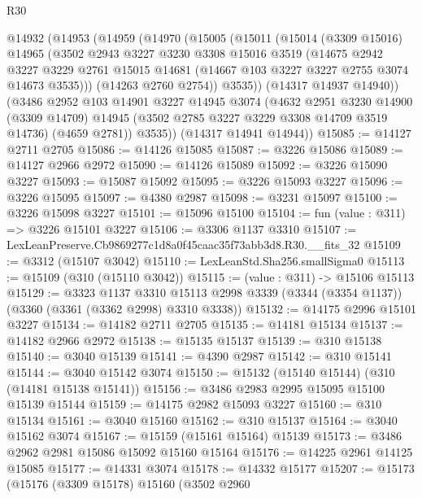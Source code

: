 \begin{lexlean}{R30}
\begin{coremodule}
  @14932
    (@14953
      (@14959
        (@14970
          (@15005
            (@15011
              (@15014
                (@3309 @15016)
                @14965
                (@3502
                  @2943
                  @3227
                  @3230
                  @3308
                  @15016
                  @3519
                  (@14675
                    @2942
                    @3227
                    @3229
                    @2761
                    @15015
                    @14681
                    (@14667 @103 @3227 @3227 @2755 @3074 @14673 @3535)))
                (@14263 @2760 @2754))
              @3535))
          (@14317 @14937 @14940))
        (@3486
          @2952
          @103
          @14901
          @3227
          @14945
          @3074
          (@4632
            @2951
            @3230
            @14900
            (@3309 @14709)
            @14945
            (@3502 @2785 @3227 @3229 @3308 @14709 @3519 @14736)
            (@4659 @2781))
          @3535))
      (@14317 @14941 @14944))
@15085 := @14127 @2711 @2705
@15086 := @14126 @15085
@15087 := @3226 @15086
@15089 := @14127 @2966 @2972
@15090 := @14126 @15089
@15092 := @3226 @15090 @3227
@15093 := @15087 @15092
@15095 := @3226 @15093 @3227
@15096 := @3226 @15095
@15097 := @4380 @2987
@15098 := @3231 @15097
@15100 := @3226 @15098 @3227
@15101 := @15096 @15100
@15104 := fun (value : @311) => @3226 @15101 @3227
@15106 := @3306 @1137 @3310
@15107 := LexLeanPreserve.Cb9869277c1d8a0f45caac35f73abb3d8.R30.__fits_32
@15109 := @3312 (@15107 @3042)
@15110 := LexLeanStd.Sha256.smallSigma0
@15113 := @15109 (@310 (@15110 @3042))
@15115 := (value : @311) -> @15106 @15113
@15129 := @3323
    @1137
    @3310
    @15113
    @2998
    @3339
    (@3344 (@3354 @1137))
    (@3360 (@3361 (@3362 @2998) @3310 @3338))
@15132 := @14175 @2996 @15101 @3227
@15134 := @14182 @2711 @2705
@15135 := @14181 @15134
@15137 := @14182 @2966 @2972
@15138 := @15135 @15137
@15139 := @310 @15138
@15140 := @3040 @15139
@15141 := @4390 @2987
@15142 := @310 @15141
@15144 := @3040 @15142 @3074
@15150 := @15132 (@15140 @15144) (@310 (@14181 @15138 @15141))
@15156 := @3486 @2983 @2995 @15095 @15100 @15139 @15144
@15159 := @14175 @2982 @15093 @3227
@15160 := @310 @15134
@15161 := @3040 @15160
@15162 := @310 @15137
@15164 := @3040 @15162 @3074
@15167 := @15159 (@15161 @15164) @15139
@15173 := @3486 @2962 @2981 @15086 @15092 @15160 @15164
@15176 := @14225 @2961 @14125 @15085
@15177 := @14331 @3074
@15178 := @14332 @15177
@15207 := @15173
    (@15176
      (@3309 @15178)
      @15160
      (@3502
        @2960

\end{coremodule}
\end{lexlean}
